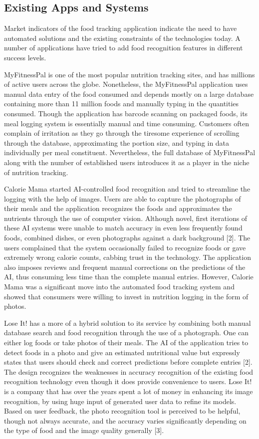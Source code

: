 \documentclass[12pt, openany]{report}
\begin{document}
\subsection{Existing Apps and Systems}
Market indicators of the food tracking application indicate the need to have automated solutions and the existing constraints of the technologies today. A number of applications have tried to add food recognition features in different success levels.

MyFitnessPal is one of the most popular nutrition tracking sites, and has millions of active users across the globe. Nonetheless, the MyFitnessPal application uses manual data entry of the food consumed and depends mostly on a large database containing more than 11 million foods and manually typing in the quantities consumed. Though the application has barcode scanning on packaged foods, its meal logging system is essentially manual and time consuming. Customers often complain of irritation as they go through the tiresome experience of scrolling through the database, approximating the portion size, and typing in data individually per meal constituent. Nevertheless, the full database of MyFitnessPal along with the number of established users introduces it as a player in the niche of nutrition tracking.

Calorie Mama started AI-controlled food recognition and tried to streamline the logging with the help of images. Users are able to capture the photographs of their meals and the application recognizes the foods and approximates the nutrients through the use of computer vision. Although novel, first iterations of these AI systems were unable to match accuracy in even less frequently found foods, combined dishes, or even photographs against a dark background [2]. The users complained that the system occasionally failed to recognize foods or gave extremely wrong calorie counts, cabbing trust in the technology. The application also imposes reviews and frequent manual corrections on the predictions of the AI, thus consuming less time than the complete manual entries. However, Calorie Mama was a significant move into the automated food tracking system and showed that consumers were willing to invest in nutrition logging in the form of photos.

Lose It! has a more of a hybrid solution to its service by combining both manual database search and food recognition through the use of a photograph. One can either log foods or take photos of their meals. The AI of the application tries to detect foods in a photo and give an estimated nutritional value but expressly states that users should check and correct predictions before complete entries [2]. The design recognizes the weaknesses in accuracy recognition of the existing food recognition technology even though it does provide convenience to users. Lose It! is a company that has over the years spent a lot of money in enhancing its image recognition, by using huge input of generated user data to refine its models. Based on user feedback, the photo recognition tool is perceived to be helpful, though not always accurate, and the accuracy varies significantly depending on the type of food and the image quality generally [3].
\end{document}
